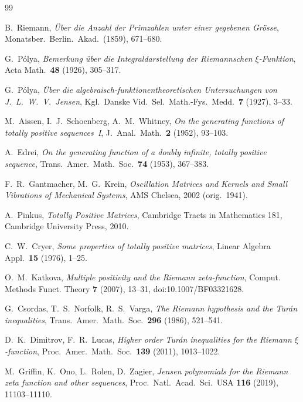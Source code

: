 \documentclass[11pt,a4paper]{article}
\theoremstyle{definition}
\begin{document}
\begin{thebibliography}{99}\small

 B.~Riemann,
\emph{\"Uber die Anzahl der Primzahlen unter einer gegebenen Gr\"osse},
Monatsber.\ Berlin.\ Akad.\ (1859), 671--680.

 G.~P\'olya,
\emph{Bemerkung \"uber die Integraldarstellung der Riemannschen
$\xi$-Funktion}, Acta Math.\ \textbf{48} (1926), 305--317.

 G.~P\'olya,
\emph{\"Uber die algebraisch-funktionentheoretischen Untersuchungen von
J.~L.~W.~V.~Jensen}, Kgl.\ Danske Vid.\ Sel.\ Math.-Fys.\ Medd.\
\textbf{7} (1927), 3--33.

 M.~Aissen, I.~J.~Schoenberg, A.~M.~Whitney,
\emph{On the generating functions of totally positive sequences~I},
J.~Anal.\ Math.\ \textbf{2} (1952), 93--103.

 A.~Edrei,
\emph{On the generating function of a doubly infinite, totally positive
sequence}, Trans.\ Amer.\ Math.\ Soc.\ \textbf{74} (1953), 367--383.

 F.~R.~Gantmacher, M.~G.~Krein,
\emph{Oscillation Matrices and Kernels and Small Vibrations of Mechanical
Systems}, AMS Chelsea, 2002 (orig.\ 1941).

 A.~Pinkus,
\emph{Totally Positive Matrices}, Cambridge Tracts in Mathematics 181,
Cambridge University Press, 2010.

 C.~W.~Cryer,
\emph{Some properties of totally positive matrices},
Linear Algebra Appl.\ \textbf{15} (1976), 1--25.

 O.~M.~Katkova,
\emph{Multiple positivity and the Riemann zeta-function},
Comput. Methods Funct. Theory \textbf{7} (2007), 13--31,
doi:10.1007/BF03321628.

 G.~Csordas, T.~S.~Norfolk, R.~S.~Varga,
\emph{The Riemann hypothesis and the Tur\'an inequalities},
Trans.\ Amer.\ Math.\ Soc.\ \textbf{296} (1986), 521--541.

 D.~K.~Dimitrov, F.~R.~Lucas,
\emph{Higher order Tur\'an inequalities for the Riemann $\xi$-function},
Proc.\ Amer.\ Math.\ Soc.\ \textbf{139} (2011), 1013--1022.

 M.~Griffin, K.~Ono, L.~Rolen, D.~Zagier,
\emph{Jensen polynomials for the Riemann zeta function and other
sequences}, Proc.\ Natl.\ Acad.\ Sci.\ USA \textbf{116} (2019),
11103--11110.


\end{thebibliography}
\end{document}
